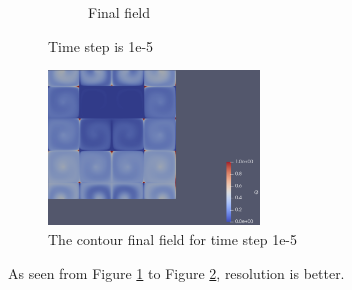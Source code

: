 \documentclass{article}
\begin{document}
\begin{figure}[hbt!]
\begin{subfigure}{0.4\textwidth}
        \caption{Final field}
  \end{subfigure}
  \caption{Time step is 1e-5}
  \label{t3m4_1} 
\end{figure}

\begin{figure}[hbt!]
    \centering
    \includegraphics[width=0.5\textwidth]{Figures/e-5 160x160/contour.png}
    \caption{The contour final field for time step 1e-5}
    \label{t3m4_2} 
\end{figure}

As seen from Figure \ref{t3m4_1} to Figure \ref{t3m4_2}, resolution is better.



\clearpage
\end{document}
